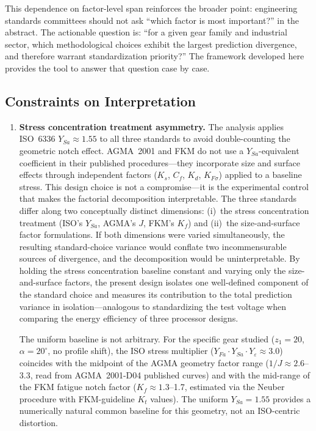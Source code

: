 \documentclass[twocolumn,12pt,a4paper]{article}
\begin{document}
This dependence on factor-level span reinforces the broader point:
engineering standards committees should not ask ``which factor is most
important?'' in the abstract. The actionable question is: ``for a given
gear family and industrial sector, which methodological choices exhibit
the largest prediction divergence, and therefore warrant
standardization priority?'' The framework developed here provides the
tool to answer that question case by case.

\subsection{Constraints on Interpretation}
\label{sec:constraints}

\begin{enumerate}
  \item \textbf{Stress concentration treatment asymmetry.} The analysis
        applies ISO~6336 $Y_{Sa} \approx 1.55$ to all three standards to
        avoid double-counting the geometric notch effect. AGMA~2001
        and FKM do not use a $Y_{Sa}$-equivalent coefficient in their
        published procedures---they incorporate size and surface effects
        through independent factors ($K_s$, $C_f$, $K_d$, $K_{F\sigma}$)
        applied to a baseline stress. This design choice is not a
        compromise---it is the experimental control that makes the
        factorial decomposition interpretable. The three standards differ
        along two conceptually distinct dimensions: (i)~the stress
        concentration treatment (ISO's $Y_{Sa}$, AGMA's $J$, FKM's
        $K_f$) and (ii)~the size-and-surface factor formulations. If both
        dimensions were varied simultaneously, the resulting
        standard-choice variance would conflate two incommensurable sources
        of divergence, and the decomposition would be uninterpretable. By
        holding the stress concentration baseline constant and varying only
        the size-and-surface factors, the present design isolates one
        well-defined component of the standard choice and measures its
        contribution to the total prediction variance in
        isolation---analogous to standardizing the test voltage when
        comparing the energy efficiency of three processor designs.

        The uniform baseline is not arbitrary. For the specific gear
        studied ($z_1=20$, $\alpha=20^\circ$, no profile shift), the
        ISO stress multiplier ($Y_{Fa} \cdot Y_{Sa} \cdot Y_\varepsilon
        \approx 3.0$) coincides with the midpoint of the AGMA geometry
        factor range ($1/J \approx 2.6$--3.3, read from AGMA~2001-D04
        published curves) and with the mid-range of the FKM fatigue notch
        factor ($K_f \approx 1.3$--1.7, estimated via the Neuber
        procedure with FKM-guideline $K_t$ values). The uniform
        $Y_{Sa}=1.55$ provides a numerically natural common baseline
        for this geometry, not an ISO-centric distortion.


\end{enumerate}
\end{document}
